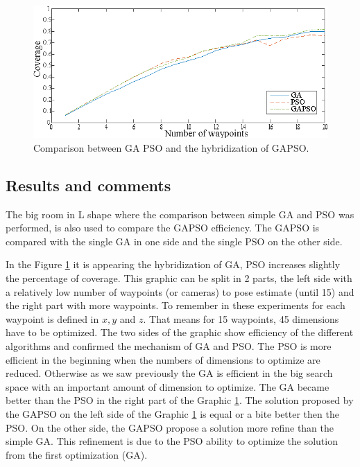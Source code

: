 \begin{figure}[t]
  \includegraphics[width=\linewidth]{img/GAPSO_GA_PSO3waypoint.eps}
  \caption{Comparison between GA PSO and the hybridization of GAPSO.
}\label{fig:GAPSO}
  \endminipage\hfill
\end{figure}

 \subsection{Results and comments }
  

The big room in L shape where the comparison between simple GA and PSO was performed, is also used to compare the GAPSO efficiency. The GAPSO is compared with the single GA in one side and the single PSO on the other side. 

In the Figure \ref{fig:GAPSO} it is appearing the hybridization of GA, PSO increases slightly the percentage of coverage.%
This graphic can be split in 2 parts, the left side with a relatively low number of waypoints (or cameras) to pose estimate (until 15) and the right part with more waypoints. To remember in these experiments for each waypoint is defined in $x, y$ and $z$. That means for 15 waypoints, 45 dimensions have to be optimized.
The two sides of the graphic show efficiency of the different algorithms and confirmed the mechanism of GA and PSO.
The PSO is more efficient in the beginning when the numbers of dimensions to optimize are reduced. Otherwise as we saw previously the GA is efficient in the big search space with an important amount of dimension to optimize. The GA became better than the PSO in the right part of the Graphic \ref{fig:GAPSO}. 
The solution  proposed by the GAPSO on the left side of the Graphic \ref{fig:GAPSO} is equal or a bite better then the PSO. On the other side, the GAPSO propose a solution more refine than the simple GA. This refinement is due to the PSO ability to optimize the solution from the first optimization (GA). 

